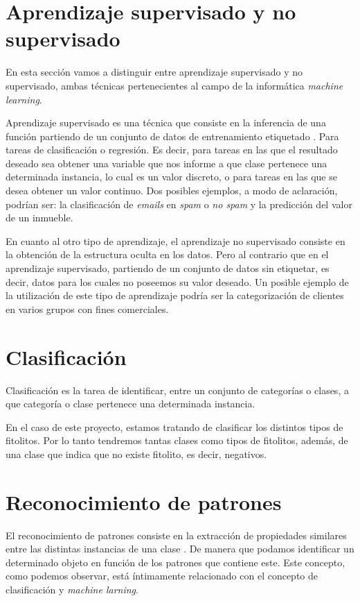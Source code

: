 \section{Aprendizaje supervisado y no supervisado}

En esta sección vamos a distinguir entre aprendizaje supervisado y no supervisado, ambas técnicas pertenecientes al campo de la informática \textit{machine learning}.

Aprendizaje supervisado es una técnica que consiste en la inferencia de una función partiendo de un conjunto de datos de entrenamiento etiquetado \cite{wiki:supervisedLearning}. Para tareas de clasificación o regresión. Es decir, para tareas en las que el resultado deseado sea obtener una variable que nos informe a que clase pertenece una determinada instancia, lo cual es un valor discreto, o para tareas en las que se desea obtener un valor continuo. Dos posibles ejemplos, a modo de aclaración,  podrían ser: la clasificación de \textit{emails} en \textit{spam} o \textit{no spam} y la predicción del valor de un inmueble.

En cuanto al otro tipo de aprendizaje, el aprendizaje no supervisado consiste en la obtención de la estructura oculta en los datos. Pero al contrario que en el aprendizaje supervisado, partiendo de un conjunto de datos sin etiquetar, es decir, datos para los cuales no poseemos su valor deseado\cite{wiki:unsupervisedLearning}. Un posible ejemplo  de la utilización de este tipo de aprendizaje podría ser la categorización de clientes en varios grupos con fines comerciales.

\section{Clasificación}

Clasificación es la tarea de identificar, entre un conjunto de  categorías o clases, a que categoría o clase pertenece una determinada instancia.

En el caso de este proyecto, estamos tratando de clasificar los distintos tipos de fitolitos. Por lo tanto tendremos tantas clases como tipos de fitolitos, además, de una clase que indica    que no existe fitolito, es decir, negativos.

\section{Reconocimiento de patrones}

El reconocimiento de patrones consiste en la extracción de propiedades similares entre las distintas instancias de una clase \cite{wiki:patternrecognition}. De manera que podamos identificar un determinado objeto en función de los patrones que contiene este. Este concepto, como podemos observar, está íntimamente relacionado con el concepto de clasificación y \textit{machine larning}.

